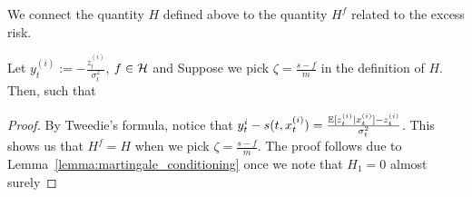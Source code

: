 We connect the quantity $H$ defined above to the quantity $H^{f}$ related to the excess risk.

\begin{lemma}\label{lemma:martingale_decomposition_1}
    Let $y_{t}^{(i)} := -\frac{z_t^{(i)}}{\sigma_t^2}$, $f\in \mathcal{H}$ and
    Suppose we pick $\zeta = \frac{s-f}{m}$ in the definition of $H$. Then, 
    such that 


\end{lemma}
\begin{proof}
By Tweedie's formula, notice that $y_t^{i}- s(t,x_t^{(i)}) = \frac{\mathbb{E} [z_t^{(i)}|x_t^{(i)}]-z_t^{(i)}}{\sigma_t^2}$. This shows us that $H^f = H$ when we pick $\zeta = \frac{s-f}{m}$. The proof follows due to Lemma~\ref{lemma:martingale_conditioning} once we note that $H_1 = 0$ almost surely
\end{proof}




